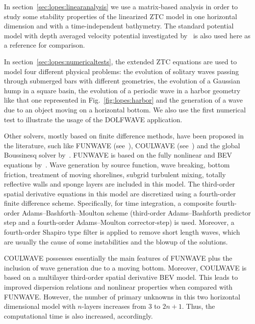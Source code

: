 In section~\ref{sec:lopes:linearanalysis}
we use a matrix-based analysis in order to
study some stability properties of the linearized ZTC model
in one horizontal dimension and with a time-independent
bathymetry. The standard potential model with depth averaged velocity
potential investigated by~\cite{LovholtPedersen2009} is also
used here as a reference for comparison.

In section~\ref{sec:lopes:numericaltests}, the extended ZTC
equations are used to model four different physical
problems: the evolution of  solitary waves passing through
submerged bars with different geometries,
the evolution of a Gaussian hump in a
square basin, the evolution of a periodic wave in a harbor
geometry like that one represented in
Fig.~\ref{fig:lopes:harbor} and the generation of a wave due
to an object moving on a horizontal bottom.  We also use the
first numerical test to illustrate the usage of the DOLFWAVE
application.

Other solvers, mostly based on finite difference methods,
have been proposed in the literature, such
like FUNWAVE (see~\cite{Kirby1998}), COULWAVE
(see~\cite{LynettLiu2004}) and the global Boussinesq solver
by~\cite{PedersenLovholt2008}.  FUNWAVE  is based on the
fully nonlinear and BEV  equations by~\cite{WeiKirby1995}.
Wave generation by source function, wave breaking, bottom friction, treatment of
moving shorelines, subgrid turbulent mixing, totally
reflective walls and sponge layers are included in this
model.
The third-order spatial derivative equations in this model are discretized using a
fourth-order finite difference scheme.
Specifically, for time integration, a composite fourth-order
Adams--Bashforth--Moulton scheme (third-order Adams--Bashforth
predictor step and a fourth-order Adams--Moulton corrector-step)
is used.
Moreover, a fourth-order Shapiro type filter is applied to remove short length
waves, which are usually the cause of some instabilities and
the blowup of the solutions.

COULWAVE possesses essentially the main features of FUNWAVE
plus the inclusion of wave generation due to a moving
bottom.  Moreover, COULWAVE is based on a multilayer
third-order spatial derivative BEV model.  This leads to
improved dispersion relations and nonlinear properties when
compared with FUNWAVE.  However, the number of primary
unknowns in this two horizontal dimensional model with
$n$-layers increases from $3$ to $2n+1$. Thus, the
computational time is also increased, accordingly.


